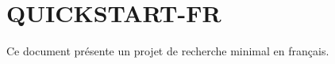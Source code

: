 \documentclass{abntexto-ufc}
\begin{document}
\section{QUICKSTART-FR}
Ce document présente un projet de recherche minimal en français.
\end{document}
